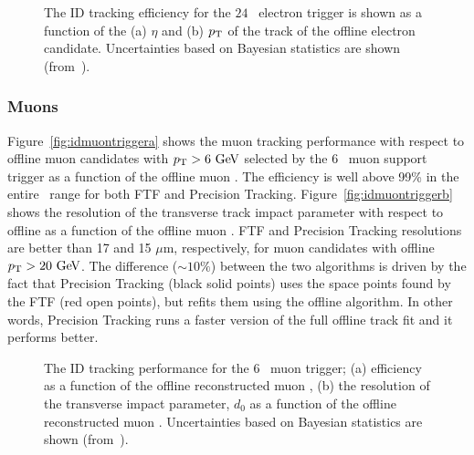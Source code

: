 					\begin{figure}[!htb]
						\begin{center}
							\hspace{0.05\textwidth}
							\hspace{0.05\textwidth}
						\end{center}
						\caption{The ID tracking efficiency for the $24$ \GeV\ electron trigger is shown as a function of the (a) $\eta$ and (b) $p_{\mathrm{T}}$ of the track of the offline electron candidate. Uncertainties based on Bayesian statistics are shown (from~\cite{ATLASTrigger2015}).}
						\label{fig:ele_idtrig_eff}
					\end{figure}


				\subsubsection*{Muons}

					Figure~\ref{fig:idmuontriggera} shows the muon tracking performance with respect to offline muon candidates with $\pt > 6 \GeV$ selected by the 6 \GeV\ muon support trigger as a function of the offline muon \pt. The efficiency is well above 99\% in the entire \pt\ range for both \ac{FTF} and Precision Tracking. Figure~\ref{fig:idmuontriggerb} shows the resolution of the transverse track impact parameter with respect to offline as a function of the offline muon \pt. \ac{FTF} and Precision Tracking resolutions are better than 17 and 15 $\mu$m, respectively, for muon candidates with offline $\pt > 20 \GeV$. The difference ($\sim 10\%$) between the two algorithms is driven by the fact that Precision Tracking (black solid points) uses the space points found by the \ac{FTF} (red open points), but refits them using the offline algorithm. In other words, Precision Tracking runs a faster version of the full offline track fit and it performs better.

					\begin{figure}[!htb]
						\begin{center}
							\hspace{0.05\textwidth}
						\end{center}
						\caption{ 
						The ID tracking performance for the 6 \GeV\ muon trigger;
						(a) efficiency as a function of the offline reconstructed muon \pt,  
						(b) the resolution of the transverse impact parameter, $d_{0}$  as a function of the offline reconstructed muon \pt. Uncertainties based on Bayesian statistics are shown (from~\cite{ATLASTrigger2015}).}
						\label{fig:idmuontrigger}
					\end{figure}



